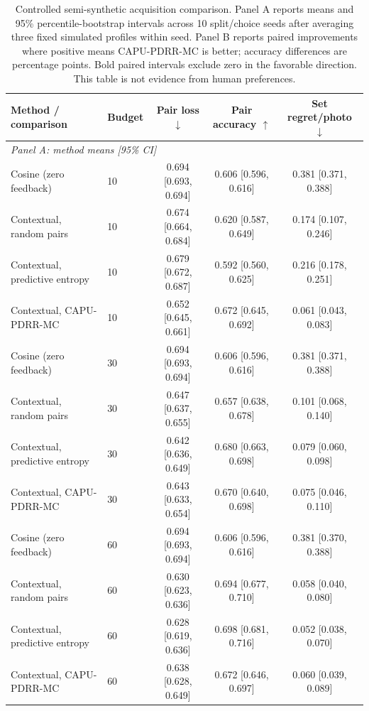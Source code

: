 \begin{table}[t]
\centering
\small
\caption{Controlled semi-synthetic acquisition comparison. Panel A reports means and 95\% percentile-bootstrap intervals across 10 split/choice seeds after averaging three fixed simulated profiles within seed. Panel B reports paired improvements where positive means CAPU-PDRR-MC is better; accuracy differences are percentage points. Bold paired intervals exclude zero in the favorable direction. This table is not evidence from human preferences.}
\label{tab:controlled-pdrr-acquisition}
\begin{tabular}{llccc}
\toprule
Method / comparison & Budget & Pair loss $\downarrow$ & Pair accuracy $\uparrow$ & Set regret/photo $\downarrow$ \\
\midrule
\multicolumn{5}{l}{\textit{Panel A: method means [95\% CI]}} \\
Cosine (zero feedback) & 10 & 0.694 [0.693, 0.694] & 0.606 [0.596, 0.616] & 0.381 [0.371, 0.388] \\
Contextual, random pairs & 10 & 0.674 [0.664, 0.684] & 0.620 [0.587, 0.649] & 0.174 [0.107, 0.246] \\
Contextual, predictive entropy & 10 & 0.679 [0.672, 0.687] & 0.592 [0.560, 0.625] & 0.216 [0.178, 0.251] \\
Contextual, CAPU-PDRR-MC & 10 & 0.652 [0.645, 0.661] & 0.672 [0.645, 0.692] & 0.061 [0.043, 0.083] \\
\addlinespace[2pt]
Cosine (zero feedback) & 30 & 0.694 [0.693, 0.694] & 0.606 [0.596, 0.616] & 0.381 [0.371, 0.388] \\
Contextual, random pairs & 30 & 0.647 [0.637, 0.655] & 0.657 [0.638, 0.678] & 0.101 [0.068, 0.140] \\
Contextual, predictive entropy & 30 & 0.642 [0.636, 0.649] & 0.680 [0.663, 0.698] & 0.079 [0.060, 0.098] \\
Contextual, CAPU-PDRR-MC & 30 & 0.643 [0.633, 0.654] & 0.670 [0.640, 0.698] & 0.075 [0.046, 0.110] \\
\addlinespace[2pt]
Cosine (zero feedback) & 60 & 0.694 [0.693, 0.694] & 0.606 [0.596, 0.616] & 0.381 [0.370, 0.388] \\
Contextual, random pairs & 60 & 0.630 [0.623, 0.636] & 0.694 [0.677, 0.710] & 0.058 [0.040, 0.080] \\
Contextual, predictive entropy & 60 & 0.628 [0.619, 0.636] & 0.698 [0.681, 0.716] & 0.052 [0.038, 0.070] \\
Contextual, CAPU-PDRR-MC & 60 & 0.638 [0.628, 0.649] & 0.672 [0.646, 0.697] & 0.060 [0.039, 0.089] \\

\end{tabular}
\end{table}

